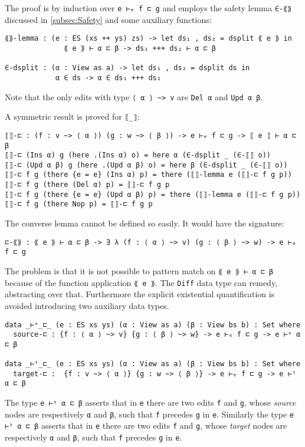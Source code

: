 \documentclass[../Thesis.tex]{subfiles}
\begin{document}
	The proof is by induction over \texttt{e ⊢ₑ f ⊏ g} and employs
	the safety lemma \texttt{∈-⟪⟫} discussed in \ref{subsec:Safety} and 
	some auxiliary functions:
\begin{verbatim}
⟪⟫-lemma : (e : ES (xs ++ ys) zs) -> let ds₁ , ds₂ = dsplit ⟪ e ⟫ in 
              ⟪ e ⟫ ⊢ α ⊏ β -> ds₁ +++ ds₂ ⊢ α ⊏ β

∈-dsplit : (α : View as a) -> let ds₁ , ds₂ = dsplit ds in 
            α ∈ ds -> α ∈ ds₁ +++ ds₂
\end{verbatim}
	Note that the only edits with type \texttt{⟨ α ⟩ \textasciitilde> v} are \texttt{Del α}
	and \texttt{Upd α β}.
	
	A symmetric result is proved for \texttt{⟦\_⟧}:
\begin{verbatim}
⟦⟧-⊏ : (f : v ~> ⟨ α ⟩) (g : w ~> ⟨ β ⟩) -> e ⊢ₑ f ⊏ g -> ⟦ e ⟧ ⊢ α ⊏ β
⟦⟧-⊏ (Ins α) g (here .(Ins α) o) = here α (∈-dsplit _ (∈-⟦⟧ o))
⟦⟧-⊏ (Upd α β) g (here .(Upd α β) o) = here β (∈-dsplit _ (∈-⟦⟧ o))
⟦⟧-⊏ f g (there {e = e} (Ins α) p) = there (⟦⟧-lemma e (⟦⟧-⊏ f g p))
⟦⟧-⊏ f g (there (Del α) p) = ⟦⟧-⊏ f g p
⟦⟧-⊏ f g (there {e = e} (Upd α β) p) = there (⟦⟧-lemma e (⟦⟧-⊏ f g p))
⟦⟧-⊏ f g (there Nop p) = ⟦⟧-⊏ f g p
\end{verbatim}
	
	The converse lemma cannot be defined so easily.
	It would have the signature:
\begin{verbatim}
⊏-⟪⟫ : ⟪ e ⟫ ⊢ α ⊏ β -> ∃ λ (f : ⟨ α ⟩ ~> v) (g : ⟨ β ⟩ ~> w) -> e ⊢ₑ f ⊏ g 
\end{verbatim}
	
	The problem is that it is not possible to pattern match on 
	\texttt{⟪ e ⟫ ⊢ α ⊏ β} because of the function application \texttt{⟪ e ⟫}.
	The \texttt{Diff} data type can remedy, abstracting over that.
	Furthermore the explicit existential quantification is avoided introducing
	two auxiliary data types.
	 
\begin{verbatim}
data _⊢ˢ_⊏_ (e : ES xs ys) (α : View as a) (β : View bs b) : Set where
  source-⊏ : {f : ⟨ α ⟩ ~> v} {g : ⟨ β ⟩ ~> w} -> e ⊢ₑ f ⊏ g -> e ⊢ˢ α ⊏ β 

data _⊢ᵗ_⊏_ (e : ES xs ys) (α : View as a) (β : View bs b) : Set where
  target-⊏ :  {f : v ~> ⟨ α ⟩} {g : w ~> ⟨ β ⟩} -> e ⊢ₑ f ⊏ g -> e ⊢ᵗ α ⊏ β
\end{verbatim}

	The type \texttt{e ⊢ˢ α ⊏ β} asserts that in \texttt{e} there are two
	edits \texttt{f} and \texttt{g}, whose \emph{source} nodes are respectively 
	\texttt{α} 	and \texttt{β}, such that \texttt{f} precedes \texttt{g} in \texttt{e}.
	Similarly the type \texttt{e ⊢ᵗ α ⊏ β} asserts that in \texttt{e} there are two
	edits \texttt{f} and \texttt{g}, whose \emph{target} nodes are respectively 
	\texttt{α} 	and \texttt{β}, such that \texttt{f} precedes \texttt{g} in \texttt{e}.
	
\end{document}
